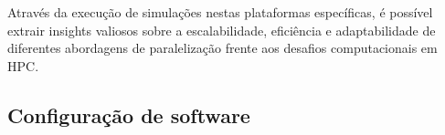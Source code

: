 \documentclass[ppgc,diss]{iiufrgs}
\begin{document}
Através da execução de simulações nestas plataformas específicas, é possível extrair insights valiosos sobre a escalabilidade, eficiência e adaptabilidade de diferentes abordagens de paralelização frente aos desafios computacionais em HPC.

\subsection{Configuração de software}







\end{document}
